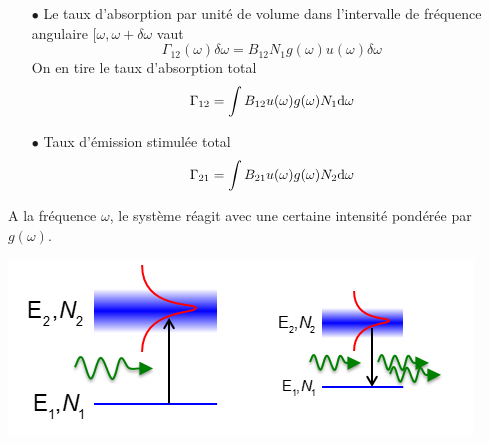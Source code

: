 	\begin{itemize}
	\item[$\bullet$] Le taux d'absorption par unité de volume dans l'intervalle de fréquence 
	angulaire $[\omega,\omega+\delta\omega$ vaut
	\begin{equation}
	{\Gamma _{12}}(\omega )\delta \omega  = {B_{12}}{N_1}g(\omega )u(\omega )\delta \omega 
	\end{equation}
	On en tire le taux d'absorption total
	\begin{equation}
	{\Gamma _{12}} = \int {{B_{12}}u(\omega )g(\omega ){N_1}{\rm{d}}\omega } 
	\end{equation}
	\item[$\bullet$] Taux d'émission stimulée total
	\begin{equation}
	{\Gamma _{21}} = \int {{B_{21}}u(\omega )g(\omega ){N_2}{\rm{d}}\omega } 
	\end{equation}
	\end{itemize}
	A la fréquence $\omega$, le système réagit avec une certaine intensité pondérée 
	par $g(\omega)$.
	\begin{center}
	\includegraphics[scale=0.65]{ch2/image13.png}
	\end{center}
	

